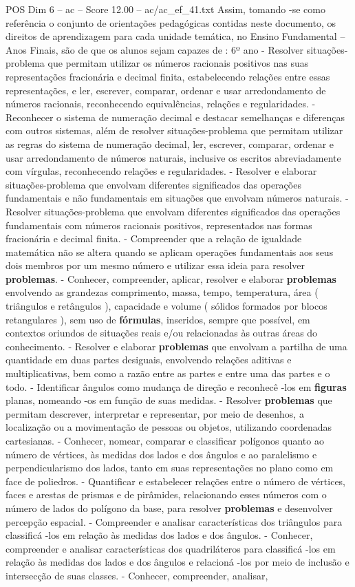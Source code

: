 \begin{textsample}{POS Dim 6 – ac – Score 12.00 – ac/ac\_ef\_41.txt}
Assim, tomando -se como referência o conjunto de orientações pedagógicas contidas neste documento, os direitos de aprendizagem para cada unidade temática, no Ensino Fundamental – Anos Finais, são de que os alunos sejam capazes de : 6º ano - Resolver situações-problema que permitam utilizar os números racionais positivos nas suas representações fracionária e decimal finita, estabelecendo relações entre essas representações, e ler, escrever, comparar, ordenar e usar arredondamento de números racionais, reconhecendo equivalências, relações e regularidades. - Reconhecer o sistema de numeração decimal e destacar semelhanças e diferenças com outros sistemas, além de resolver situações-problema que permitam utilizar as regras do sistema de numeração decimal, ler, escrever, comparar, ordenar e usar arredondamento de números naturais, inclusive os escritos abreviadamente com vírgulas, reconhecendo relações e regularidades. - Resolver e elaborar situações-problema que envolvam diferentes significados das operações fundamentais e não fundamentais em situações que envolvam números naturais. - Resolver situações-problema que envolvam diferentes significados das operações fundamentais com números racionais positivos, representados nas formas fracionária e decimal finita. - Compreender que a relação de igualdade matemática não se altera quando se aplicam operações fundamentais aos seus dois membros por um mesmo número e utilizar essa ideia para resolver \textbf{problemas}. - Conhecer, compreender, aplicar, resolver e elaborar \textbf{problemas} envolvendo as grandezas comprimento, massa, tempo, temperatura, área ( triângulos e retângulos ), capacidade e volume ( sólidos formados por blocos retangulares ), sem uso de \textbf{fórmulas}, inseridos, sempre que possível, em contextos oriundos de situações reais e/ou relacionadas às outras áreas do conhecimento. - Resolver e elaborar \textbf{problemas} que envolvam a partilha de uma quantidade em duas partes desiguais, envolvendo relações aditivas e multiplicativas, bem como a razão entre as partes e entre uma das partes e o todo. - Identificar ângulos como mudança de direção e reconhecê -los em \textbf{figuras} planas, nomeando -os em função de suas medidas. - Resolver \textbf{problemas} que permitam descrever, interpretar e representar, por meio de desenhos, a localização ou a movimentação de pessoas ou objetos, utilizando coordenadas cartesianas. - Conhecer, nomear, comparar e classificar polígonos quanto ao número de vértices, às medidas dos lados e dos ângulos e ao paralelismo e perpendicularismo dos lados, tanto em suas representações no plano como em face de poliedros. - Quantificar e estabelecer relações entre o número de vértices, faces e arestas de prismas e de pirâmides, relacionando esses números com o número de lados do polígono da base, para resolver \textbf{problemas} e desenvolver percepção espacial. - Compreender e analisar características dos triângulos para classificá -los em relação às medidas dos lados e dos ângulos. - Conhecer, compreender e analisar características dos quadriláteros para classificá -los em relação às medidas dos lados e dos ângulos e relacioná -los por meio de inclusão e intersecção de suas classes. - Conhecer, compreender, analisar, 
\end{textsample}
